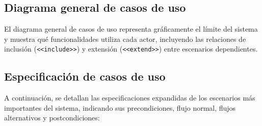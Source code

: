 \subsection{Diagrama general de casos de uso}
El diagrama general de casos de uso representa gráficamente el límite del sistema y muestra qué funcionalidades utiliza cada actor, incluyendo las relaciones de inclusión (\texttt{<<include>>}) y extensión (\texttt{<<extend>>}) entre escenarios dependientes.


\subsection{Especificación de casos de uso}
A continuación, se detallan las especificaciones expandidas de los escenarios más importantes del sistema, indicando sus precondiciones, flujo normal, flujos alternativos y postcondiciones:

